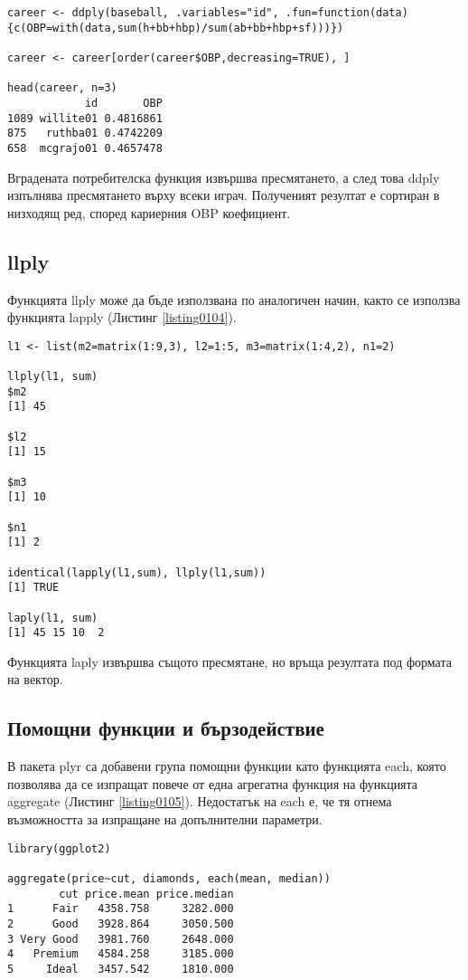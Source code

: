 \begin{lstlisting}[caption=Пресмятане на OBP за цялата кариера на играча, label=listing0103]
career <- ddply(baseball, .variables="id", .fun=function(data){c(OBP=with(data,sum(h+bb+hbp)/sum(ab+bb+hbp+sf)))})

career <- career[order(career$OBP,decreasing=TRUE), ]

head(career, n=3)
            id       OBP
1089 willite01 0.4816861
875   ruthba01 0.4742209
658  mcgrajo01 0.4657478
\end{lstlisting}

Вградената потребителска функция извършва пресмятането, а след това ddply изпълнява пресмятането върху всеки играч. Полученият резултат е сортиран в низходящ ред, според кариерния OBP коефициент.

\subsection{llply}

Функцията llply може да бъде използвана по аналогичен начин, както се използва функцията lapply (Листинг \ref{listing0104}).

\begin{lstlisting}[caption=Сума на всеки елемент в списък, label=listing0104]
l1 <- list(m2=matrix(1:9,3), l2=1:5, m3=matrix(1:4,2), n1=2)

llply(l1, sum)
$m2
[1] 45

$l2
[1] 15

$m3
[1] 10

$n1
[1] 2

identical(lapply(l1,sum), llply(l1,sum))
[1] TRUE

laply(l1, sum)
[1] 45 15 10  2
\end{lstlisting}

Функцията laply извършва същото пресмятане, но връща резултата под формата на вектор.

\subsection{Помощни функции и бързодействие}

В пакета plyr са добавени група помощни функции като функцията each, която позволява да се изпращат повече от една агрегатна функция на функцията aggregate (Листинг \ref{listing0105}). Недостатък на each е, че тя отнема възможността за изпращане на допълнителни параметри.

\begin{lstlisting}[caption=Повече от една агрегатна функция, label=listing0105]
library(ggplot2)

aggregate(price~cut, diamonds, each(mean, median))
        cut price.mean price.median
1      Fair   4358.758     3282.000
2      Good   3928.864     3050.500
3 Very Good   3981.760     2648.000
4   Premium   4584.258     3185.000
5     Ideal   3457.542     1810.000
\end{lstlisting}

